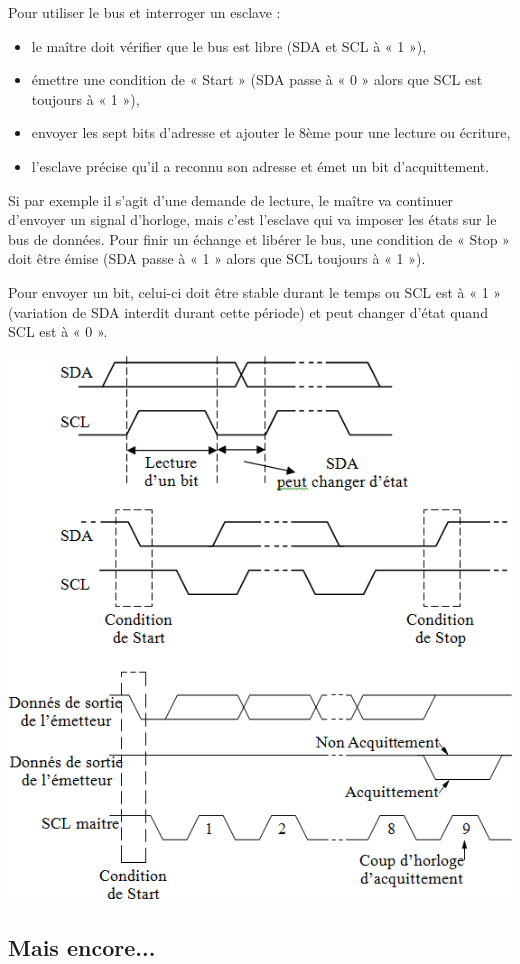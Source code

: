 \documentclass[10pt]{article}
\begin{document}
Pour utiliser le bus et interroger un esclave :
\begin{itemize}
\item le maître doit vérifier que le bus est libre (SDA et SCL à « 1 »),
\item émettre une condition de « Start » (SDA passe à « 0 » alors que SCL est toujours à « 1 »),
\item envoyer les sept bits d’adresse et ajouter le 8ème pour une lecture ou écriture,
\item l’esclave précise qu’il a reconnu son adresse et émet un bit d’acquittement.
\end{itemize}

Si par exemple il s’agit d’une demande de lecture, le maître va continuer d’envoyer un signal d’horloge, mais c’est l’esclave qui va imposer les états sur le bus de données. 
Pour finir un échange et libérer le bus, une condition de « Stop » doit être émise (SDA passe à « 1 » alors que SCL toujours à « 1 »).

Pour envoyer un bit, celui-ci doit être stable durant le temps ou SCL est à « 1 » (variation de SDA interdit durant cette période) et peut changer d’état quand SCL est à « 0 ».

\begin{center}
\includegraphics[width=.8\textwidth]{images/fig_22}
\end{center}

\subsection{Mais encore...}
\end{document}
